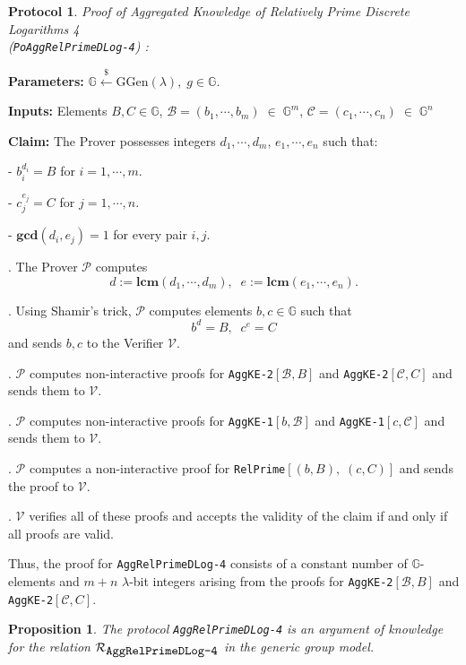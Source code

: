 \documentclass[11pt, lettersize, notitlepage, leqno, footskip=0.6cm]{article}
\newcommand{\mc}{\mathcal}
\newcommand{\mb}{\mathbb}
\newcommand{\mbf}{\mathbf}
\newcommand{\mr}{\mathrm}
\newcommand{\lam}{\lambda}
\newcommand{\lamb}{\lambda}
\newcommand{\mP}{\mc{P}}
\newcommand{\vs}{\vspace{-0.15cm}}
\newcommand{\LCM}{\mbf{lcm}}
\newcommand{\GCD}{\mbf{gcd}}
\newtheorem{Prop}[Thm]{Proposition}
\newtheorem{Prot}[Thm]{Protocol}
\numberwithin{equation}{section}
\begin{document}
\begin{Prot} \normalfont \textit{Proof of Aggregated Knowledge of Relatively Prime Discrete Logarithms} 4\\ (\verb|PoAggRelPrimeDLog-4|) :\end{Prot}\vspace{-0.3cm}

\noindent \textbf{Parameters:} $\mb{G}\xleftarrow{\$} \mr{GGen}(\lamb), \; g\in \mb{G}$.

\noindent \textbf{Inputs:} Elements $B, C\in \mb{G}$,\;  $\mc{B} = (b_1,\cdots, b_m)\;\in\;\mb{G}^m$,\;\; $\mc{C} = (c_1,\cdots, c_n)\;\in\;\mb{G}^n$

\noindent \textbf{Claim:} The Prover possesses integers $ d_1,\cdots, d_m$,\; $e_1,\cdots,e_n$ such that:

\noindent - $b_i^{d_i} = B$ for $i = 1,\cdots, m$.

\noindent - $c_j^{e_j} = C$ for $j = 1,\cdots, n$.

\noindent - $\GCD(d_i, e_j) = 1$ for every pair $i, j$.

\begin{prf1} . The Prover $\mc{P}$ computes \vs $${d}:= \LCM(d_1,\cdots,d_m),\;\; {e}:= \LCM(e_1,\cdots,e_n).$$

. Using Shamir's trick, $\mP$ computes elements $b, c \in \mb{G}$ such that \vspace{-0.15cm}$$b^{d} = B,\;\; c^{e} = C$$ and sends $b,c$ to the Verifier $\mc{V}$.

. $\mc{P}$ computes non-interactive proofs for \verb|AggKE-2|$[\mc{B}, B]$ and \verb|AggKE-2|$[\mc{C}, C]$ and sends them to $\mc{V}$.

. $\mc{P}$ computes non-interactive proofs for \verb|AggKE-1|$[b,\mc{B}]$ and \verb|AggKE-1|$[c, \mc{C}]$ and sends them to $\mc{V}$.

. $\mc{P}$ computes a non-interactive proof for \verb|RelPrime|$[(b,B),\;(c,C)]$ and sends the proof to $\mc{V}$.

. $\mc{V}$ verifies all of these proofs and accepts the validity of the claim if and only if all proofs are valid.\end{prf1}

\noindent Thus, the proof for \verb|AggRelPrimeDLog-4| consists of a constant number of $\mb{G}$-elements and $m+n$ $\lam$-bit integers arising from the proofs for \verb|AggKE-2|$[\mc{B}, B]$ and \verb|AggKE-2|$[\mc{C}, C]$.


\begin{Prop} The protocol \verb|AggRelPrimeDLog-4| is an argument of knowledge for the relation $\mc{R}_{{\protect\verb|AggRelPrimeDLog-4|}}$ in the generic group model.\end{Prop}
\end{document}
